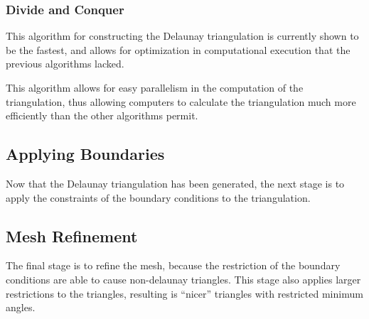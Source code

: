 \documentclass[fem.tex]{subfiles}
\begin{document}
\subsubsection{Divide and Conquer}%
\label{ssub:divide_and_conquer}

This algorithm for constructing the Delaunay triangulation is currently shown
to be the fastest, and allows for optimization in computational execution
that the previous algorithms lacked.

This algorithm allows for easy parallelism in the computation of the
triangulation, thus allowing computers to calculate the triangulation much more
efficiently than the other algorithms permit.

\subsection{Applying Boundaries}%
\label{sub:applying_boundaries}

Now that the Delaunay triangulation has been generated, the next stage is to
apply the constraints of the boundary conditions to the triangulation.

\subsection{Mesh Refinement}%
\label{sub:mesh_refinement}

The final stage is to refine the mesh, because the restriction of the boundary
conditions are able to cause non-delaunay triangles. This stage also applies
larger restrictions to the triangles, resulting is ``nicer'' triangles with
restricted minimum angles.
\end{document}
